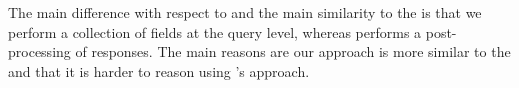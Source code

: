 
The main difference with respect to \HP and the main similarity to the \spec is that we perform a collection of fields at the query level, whereas \HP performs a post-processing of responses. The main reasons are our approach is more similar to the \spec and that it is harder to reason using \HP's approach.



